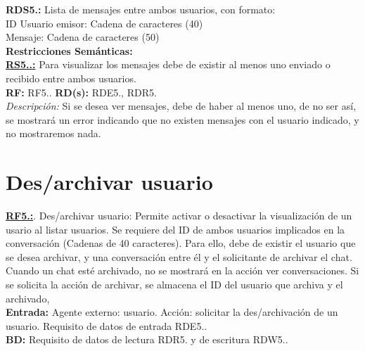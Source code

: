 \textcolor{azul}{\textbf{RDS5.\theRDS:}} Lista de mensajes entre ambos usuarios, con formato:\\
\hspace*{1cm} ID Usuario emisor: Cadena de caracteres (40) \\
\hspace*{1cm} Mensaje: Cadena de caracteres (50) \\[12pt]

\setcounter{RS}{1}
\textbf{\textcolor{verde}{Restricciones Semánticas:}} \\[6pt]
\textbf{\textcolor{verde}{\underline{RS5.\theRF.\theRS:}}} Para visualizar los mensajes debe de existir al menos uno enviado o recibido entre ambos usuarios. \\
\textbf{RF:} RF5.\theRF. \textbf{RD(s):} RDE5.\theRDE, RDR5.\theRDR \\
\hspace*{1cm} \textit{Descripción:} Si se desea ver mensajes, debe de haber al menos uno, de no ser así, se mostrará un error indicando que no existen mensajes con el usuario indicado, y no mostraremos nada. \\ [6pt]

\section{Des/archivar usuario}
\textbf{\textcolor{rojo}{\underline{RF5.\theRF:}}}. Des/archivar usuario: Permite activar o desactivar la visualización de un usario al listar usuarios. 
Se requiere del ID de ambos usuarios implicados en la conversación (Cadenas de 40 caracteres). Para ello, debe de existir 
el usuario que se desea archivar, y una conversación entre él y el solicitante de archivar el chat. Cuando un chat esté archivado, no se mostrará en la acción ver 
conversaciones. Si se solicita la acción de archivar, se almacena el ID del usuario que archiva y el archivado, \\[6pt]

\textbf{\textcolor{rojo}{Entrada:}} Agente externo: usuario. Acción: solicitar la des/archivación de un usuario. 
Requisito de datos de entrada \textcolor{azul}{RDE5.\theRDE}. \\[6pt]

\textbf{\textcolor{rojo}{BD:}} Requisito de datos de lectura \textcolor{azul}{RDR5.\theRDR} y de escritura \textcolor{azul}{RDW5.\theRDW}. \\[6pt]

